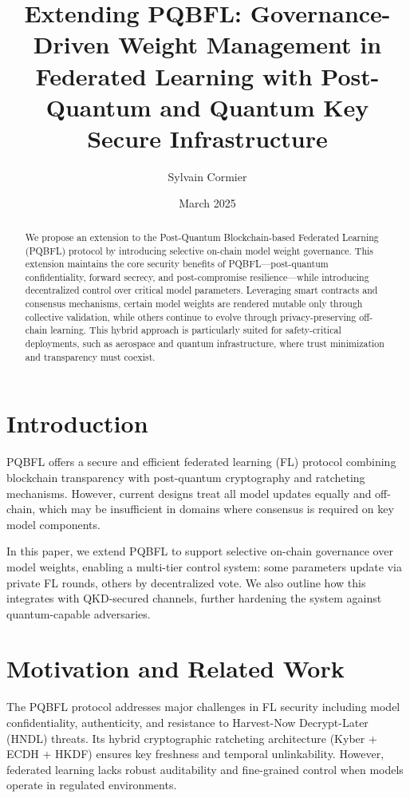 \documentclass[11pt]{article}
\title{Extending PQBFL: Governance-Driven Weight Management in Federated Learning with Post-Quantum and Quantum Key Secure Infrastructure}
\author[1]{Sylvain Cormier}
\affil[1]{Paraxiom, Sainte-Ad\`ele, Qu\'ebec, Canada\\
	\texttt{https://paraxiom.org}}
\date{March 2025}
\begin{document}
	\maketitle
	
	\begin{abstract}
		We propose an extension to the Post-Quantum Blockchain-based Federated Learning (PQBFL) protocol by introducing selective on-chain model weight governance. This extension maintains the core security benefits of PQBFL—post-quantum confidentiality, forward secrecy, and post-compromise resilience—while introducing decentralized control over critical model parameters. Leveraging smart contracts and consensus mechanisms, certain model weights are rendered mutable only through collective validation, while others continue to evolve through privacy-preserving off-chain learning. This hybrid approach is particularly suited for safety-critical deployments, such as aerospace and quantum infrastructure, where trust minimization and transparency must coexist.
	\end{abstract}
	
	\section{Introduction}
	PQBFL \cite{gharavi2025pqbfl} offers a secure and efficient federated learning (FL) protocol combining blockchain transparency with post-quantum cryptography and ratcheting mechanisms. However, current designs treat all model updates equally and off-chain, which may be insufficient in domains where consensus is required on key model components.
	
	In this paper, we extend PQBFL to support selective on-chain governance over model weights, enabling a multi-tier control system: some parameters update via private FL rounds, others by decentralized vote. We also outline how this integrates with QKD-secured channels, further hardening the system against quantum-capable adversaries.
	
	\section{Motivation and Related Work}
	The PQBFL protocol \cite{gharavi2025pqbfl} addresses major challenges in FL security including model confidentiality, authenticity, and resistance to Harvest-Now Decrypt-Later (HNDL) threats. Its hybrid cryptographic ratcheting architecture (Kyber + ECDH + HKDF) ensures key freshness and temporal unlinkability. However, federated learning lacks robust auditability and fine-grained control when models operate in regulated environments.
	
\end{document}
